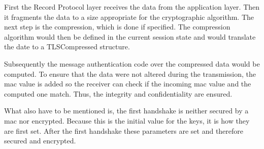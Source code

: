 First the Record Protocol layer receives the data from the application layer. Then it fragments the data to a size appropriate for the cryptographic algorithm. 
The next step is the compression, which is done if specified. The compression algorithm would then be defined in the current session state and would translate the date to a TLSCompressed structure.
 
Subsequently the message authentication code over the compressed data would be computed.
To ensure that the data were not altered during the transmission, the \gls{mac} value is added so the receiver can check if the incoming \gls{mac} value and the computed one 
match. Thus, the integrity and confidentiality are ensured.

What also have to be mentioned is, the first handshake is neither secured by a \gls{mac} nor encrypted. Because this is the initial value for the keys, it is how they are first set. After the first handshake these parameters are set and therefore secured and encrypted.
\cite{ms:Record} \cite{Hassenstein}